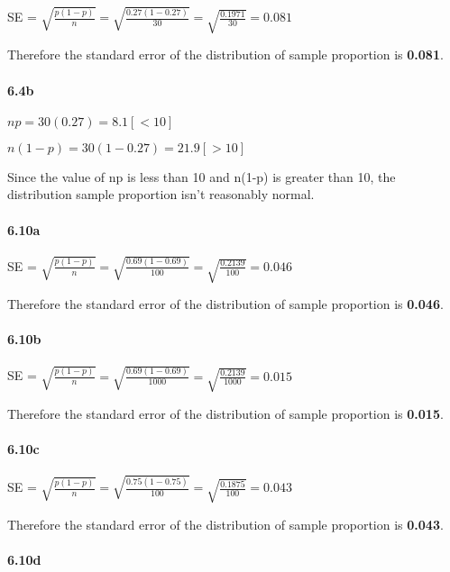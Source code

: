 \documentclass[
]{article}
\begin{document}
SE =
\(\sqrt{\frac{p(1-p)}{n}}=\sqrt{\frac{0.27(1-0.27)}{30}}= \sqrt{\frac{0.1971}{30}} = 0.081\)

Therefore the standard error of the distribution of sample proportion is
\textbf{0.081}.

\hypertarget{b-15}{%
\paragraph{6.4b}\label{b-15}}

\(np = 30(0.27) = 8.1 [<10]\)

\(n(1-p) = 30(1-0.27) = 21.9 [>10]\)

Since the value of np is less than 10 and n(1-p) is greater than 10, the
distribution sample proportion isn't reasonably normal.

\hypertarget{a-16}{%
\paragraph{6.10a}\label{a-16}}

SE =
\(\sqrt{\frac{p(1-p)}{n}}=\sqrt{\frac{0.69(1-0.69)}{100}}= \sqrt{\frac{0.2139}{100}} = 0.046\)

Therefore the standard error of the distribution of sample proportion is
\textbf{0.046}.

\hypertarget{b-16}{%
\paragraph{6.10b}\label{b-16}}

SE =
\(\sqrt{\frac{p(1-p)}{n}}=\sqrt{\frac{0.69(1-0.69)}{1000}}= \sqrt{\frac{0.2139}{1000}} = 0.015\)

Therefore the standard error of the distribution of sample proportion is
\textbf{0.015}.

\hypertarget{c-11}{%
\paragraph{6.10c}\label{c-11}}

SE =
\(\sqrt{\frac{p(1-p)}{n}}=\sqrt{\frac{0.75(1-0.75)}{100}}= \sqrt{\frac{0.1875}{100}} = 0.043\)

Therefore the standard error of the distribution of sample proportion is
\textbf{0.043}.

\hypertarget{d-8}{%
\paragraph{6.10d}\label{d-8}}
\end{document}
